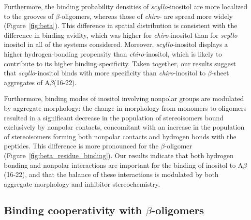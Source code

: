 
Furthermore, the binding probability densities of \emph{scyllo}-inositol are more localized to the grooves of $\beta$-oligomers, whereas those of \emph{chiro}- are spread more widely (Figure~{\ref{fig:beta}}). This difference in spatial distribution is consistent with the difference in binding avidity, which was higher for \emph{chiro}-inositol than for \emph{scyllo}-inositol in all of the systems considered. Moreover, \emph{scyllo}-inositol displays a higher hydrogen-bonding propensity than \emph{chiro}-inositol, which is likely to contribute to its higher binding specificity. %
Taken together, our results suggest that \emph{scyllo}-inositol binds with more specificity than \emph{chiro}-inositol to $\beta$-sheet aggregates of A$\beta$(16-22).

Furthermore, binding modes of inositol involving nonpolar groups are modulated by aggregate morphology: the change in morphology from monomers to oligomers resulted in a significant decrease in the population of stereoisomers bound exclusively by nonpolar contacts, concomitant with an increase in the population of stereoisomers forming both nonpolar contacts and hydrogen bonds with the peptides. This difference is more pronounced for the $\beta$-oligomer (Figure~{\ref{fig:beta_residue_binding}}). Our results indicate that both hydrogen bonding and nonpolar interactions are important for the binding of inositol to A$\beta$(16-22), and that the balance of these interactions is modulated by both aggregate morphology and inhibitor stereochemistry.

\subsection{Binding cooperativity with $\beta$-oligomers}

